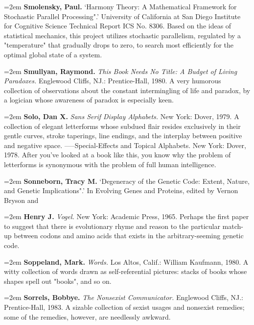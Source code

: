 \par\noindent\hangindent=2em {\bf Smolensky, Paul.} `Harmony Theory: A Mathematical Framework for Stochastic Parallel Processing".' University of California at San Diego Institute for Cognitive Science Technical Report ICS No. 8306. Based on the ideas of statistical mechanics, this project utilizes stochastic parallelism, regulated by a "temperature" that gradually drops to zero, to search most efficiently for the optimal global state of a system.

\par\noindent\hangindent=2em {\bf Smullyan, Raymond.} {\it This Book Needs No Title: A Budget of Living Paradoxes.} Englewood Cliffs, NJ.: Prentice-Hall, 1980. A very humorous collection of observations about the constant intermingling of life and paradox, by a logician whose awareness of paradox is especially keen.

\par\noindent\hangindent=2em {\bf Solo, Dan X.} {\it Sans Serif Display Alphabets.} New York: Dover, 1979. A collection of elegant letterforms whose subdued flair resides exclusively in their gentle curves, stroke taperings, line endings, and the interplay between positive and negative space. -----Special-Effects and Topical Alphabets. New York: Dover, 1978. After you've looked at a book like this, you know why the problem of letterforms is synonymous with the problem of full human intelligence.

\par\noindent\hangindent=2em {\bf Sonneborn, Tracy M.} `Degeneracy of the Genetic Code: Extent, Nature, and Genetic Implications".' In Evolving Genes and Proteins, edited by Vernon Bryson and

\par\noindent\hangindent=2em {\bf Henry J.} {\it Vogel.} New York: Academic Press, 1965. Perhaps the first paper to suggest that there is evolutionary rhyme and reason to the particular match-up between codons and amino acids that exists in the arbitrary-seeming genetic code.

\par\noindent\hangindent=2em {\bf Soppeland, Mark.} {\it Words.} Los Altos, Calif.: William Kaufmann, 1980. A witty collection of words drawn as self-referential pictures: stacks of books whose shapes spell out "books", and so on.

\par\noindent\hangindent=2em {\bf Sorrels, Bobbye.} {\it The Nonsexist Communicator.} Englewood Cliffs, NJ.: Prentice-Hall, 1983. A sizable collection of sexist usages and nonsexist remedies; some of the remedies, however, are needlessly awkward.

